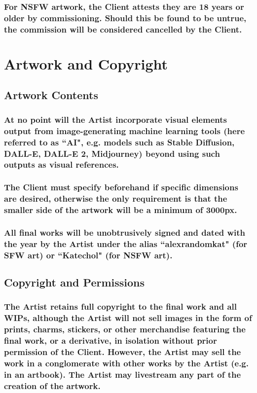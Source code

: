 \documentclass{article}
\begin{document}
\begin{flushleft}
		\subsubsection[Age Restrictions]{\normalfont For NSFW artwork, the Client attests they are 18 years or older by commissioning. Should this be found to be untrue, the commission will be considered cancelled by the Client.}

\leftskip=0cm
\section{Artwork and Copyright}

	\leftskip=1cm
	\subsection{Artwork Contents}

		\leftskip=2cm
		\subsubsection[Artist AI Policy]{\normalfont At no point will the Artist incorporate visual elements output from  image-generating machine learning tools (here referred to as ``AI", e.g. models such as Stable Diffusion, DALL-E, DALL-E 2, Midjourney) beyond using such outputs as visual references.}

		\subsubsection[Artwork Dimensions]{\normalfont The Client must specify beforehand if specific dimensions are desired, otherwise the only requirement is that the smaller side of the artwork will be a minimum of 3000px.}

		\subsubsection[Signatures]{\normalfont All final works will be unobtrusively signed and dated with the year by the Artist under the alias ``alexrandomkat" (for SFW art) or ``Katechol" (for NSFW art).}
	\leftskip=1cm
	\subsection{Copyright and Permissions}
	
		\leftskip=2cm
		\subsubsection[Artist Copyright]{\normalfont The Artist retains full copyright to the final work and all WIPs, although the Artist will not sell images in the form of prints, charms, stickers, or other merchandise featuring the final work, or a derivative, in isolation without prior permission of the Client. However, the Artist may sell the work in a conglomerate with other works by the Artist (e.g. in an artbook). The Artist may livestream any part of the creation of the artwork.}
		

\end{flushleft}
\end{document}
